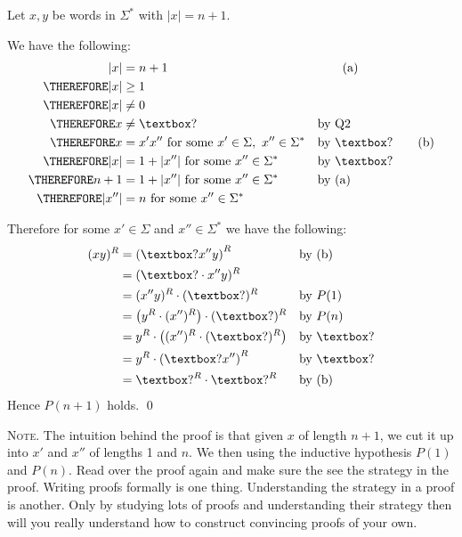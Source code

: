 Let $x,y$ be words in $\Sigma^*$ with $|x| = n + 1$.

We have the following:
\begin{align*}
           |x| &= n + 1                                                   & & \tag{a} \\ 
\THEREFORE |x| &\geq 1 \\
\THEREFORE |x| &\neq 0 \\
\THEREFORE x &\neq \answerbox{?}                                          & & \text{by Q2} \\
\THEREFORE x &= x'x'' \text{ for some } x' \in \Sigma, \ x'' \in \Sigma^* & & \text{by \answerbox{?}} \tag{b} \\
\THEREFORE |x| &= 1 + |x''| \text{ for some } x'' \in \Sigma^*            & & \text{by \answerbox{?}} \\
\THEREFORE n + 1 &= 1 + |x''| \text{ for some } x'' \in \Sigma^*          & & \text{by (a)} \\
\THEREFORE |x''| &= n \text{ for some } x'' \in \Sigma^*
\end{align*}

Therefore for some $x' \in \Sigma$ and $x'' \in \Sigma^*$
we have the following:
\begin{align*}
(xy)^R
&= \left( \answerbox{?}x'' y \right)^R                      & & \text{by (b)} \\
&= (\answerbox{?} \cdot x''y)^R                                               \\
&= (x''y)^R \cdot (\answerbox{?})^R                         & & \text{by $P(1)$}\\
&= \left( y^R \cdot (x'')^R \right) \cdot (\answerbox{?})^R & & \text{by $P(n)$} \\
&= y^R \cdot \left( (x'')^R \cdot (\answerbox{?})^R \right) & & \text{by \answerbox{?}}\\
&= y^R \cdot \left( \answerbox{?}x'' \right)^R              & & \text{by \answerbox{?}}\\
&= \answerbox{?}^R \cdot \answerbox{?}^R                    & & \text{by (b)} 
\end{align*}
Hence $P(n+1)$ holds.
\qed


\textsc{Note.}
The intuition behind the proof is that 
given $x$ of length $n + 1$,
we cut it up into $x'$ and $x''$ of lengths 1 and $n$.
We then using the inductive hypothesis $P(1)$ and $P(n)$.
Read over the proof again and make sure the see the strategy
in the proof.
Writing proofs formally is one thing.
Understanding the strategy in a proof is another.
Only by studying lots of proofs and understanding their strategy
then will you really understand how to construct convincing proofs
of your own.
